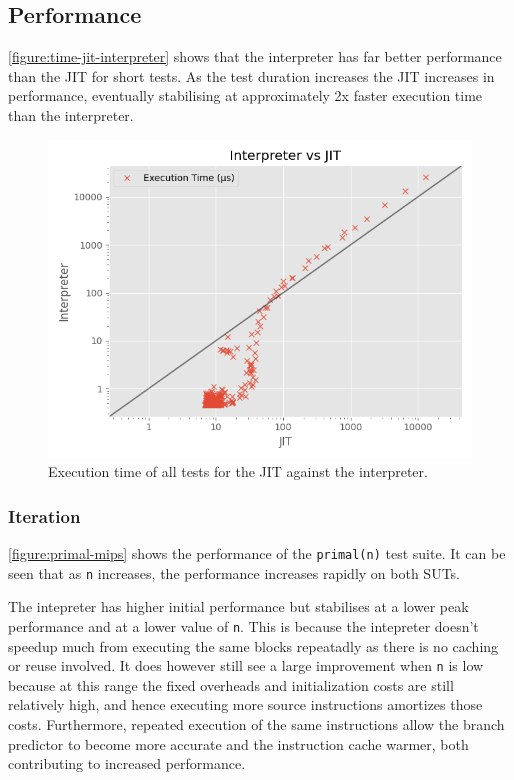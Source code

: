 \subsection{Performance}

\autoref{figure:time-jit-interpreter} shows that the interpreter has far better performance than the JIT for short tests. As the test duration increases the JIT increases in performance, eventually stabilising at approximately 2x faster execution time than the interpreter.

\begin{figure}
    \centering
    \includegraphics{output/graphs/scatter/time.png}
    \caption{Execution time of all tests for the JIT against the interpreter.}
    \label{figure:time-jit-interpreter}
\end{figure}

\subsubsection{Iteration}

\autoref{figure:primal-mips} shows the performance of the \texttt{primal(n)} test suite. It can be seen that as \texttt{n} increases, the performance increases rapidly on both SUTs.

The intepreter has higher initial performance but stabilises at a lower peak performance and at a lower value of \texttt{n}. This is because the intepreter doesn't speedup much from executing the same blocks repeatadly as there is no caching or reuse involved. It does however still see a large improvement when \texttt{n} is low because at this range the fixed overheads and initialization costs are still relatively high, and hence executing more source instructions amortizes those costs. Furthermore, repeated execution of the same instructions allow the branch predictor to become more accurate and the instruction cache warmer, both contributing to increased performance.


